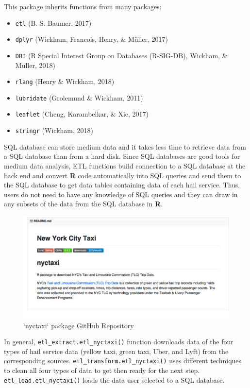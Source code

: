 \documentclass[12pt,twoside]{reedthesis}
\providecommand{\tightlist}{%
  \setlength{\itemsep}{0pt}\setlength{\parskip}{0pt}}
\theoremstyle{definition}
\theoremstyle{definition}
\theoremstyle{definition}
\theoremstyle{remark}
\begin{document}
This package inherits functions from many packages:
\begin{itemize}
\tightlist
\item
  \texttt{etl} (B. S. Baumer, 2017)
\item
  \texttt{dplyr} (Wickham, Francois, Henry, \& Müller, 2017)
\item
  \texttt{DBI} (R Special Interest Group on Databases (R-SIG-DB),
  Wickham, \& Müller, 2018)
\item
  \texttt{rlang} (Henry \& Wickham, 2018)
\item
  \texttt{lubridate} (Grolemund \& Wickham, 2011)
\item
  \texttt{leaflet} (Cheng, Karambelkar, \& Xie, 2017)
\item
  \texttt{stringr} (Wickham, 2018)
\end{itemize}
SQL database can store medium data and it takes less time to retrieve
data from a SQL database than from a hard disk. Since SQL databases are
good tools for medium data analysis, ETL functions build connection to a
SQL database at the back end and convert \textbf{R} code automatically
into SQL queries and send them to the SQL database to get data tables
containing data of each hail service. Thus, users do not need to have
any knowledge of SQL queries and they can draw in any subsets of the
data from the SQL database in \textbf{R}.
\begin{figure}[h]

{\centering \includegraphics[width=5.88in]{figure/nyctaxi-page} 

}

\caption{`nyctaxi` package GitHub Repository}\label{fig:nyctaxi-page}
\end{figure}
In general, \texttt{etl\_extract.etl\_nyctaxi()} function downloads data
of the four types of hail service data (yellow taxi, green taxi, Uber,
and Lyft) from the corresponding sources.
\texttt{etl\_transform.etl\_nyctaxi()} uses different techniques to
clean all four types of data to get then ready for the next step.
\texttt{etl\_load.etl\_nyctaxi()} loads the data user selected to a SQL
database.
\end{document}
